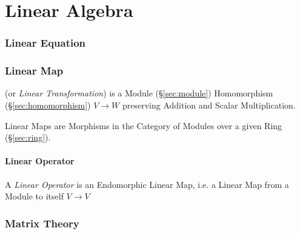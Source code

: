 \part{Linear Algebra}\label{sec:linear_algebra}

\section{Linear Equation}\label{sec:linear_equation}

\section{Linear Map}\label{sec:linear_map}

(or \emph{Linear Transformation}) is a Module (\S\ref{sec:module})
Homomorphism (\S\ref{sec:homomorphism}) $V \rightarrow W$ preserving
Addition and Scalar Multiplication.

Linear Maps are Morphisms in the Category of Modules over a given Ring
(\S\ref{sec:ring}).



\subsection{Linear Operator}\label{sec:linear_operator}

A \emph{Linear Operator} is an Endomorphic Linear Map, i.e. a Linear
Map from a Module to itself $V \rightarrow V$



\section{Matrix Theory}\label{sec:matrix_theory}


